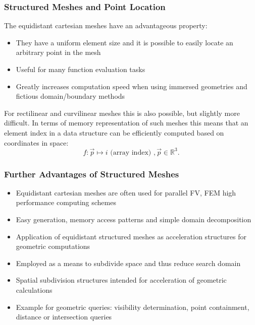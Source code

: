 \begin{frame}
\frametitle{Structured Meshes and Point Location}
The equidistant cartesian meshes have an advantageous property: 
\begin{itemize}
\item They have a uniform element size and it is possible to easily locate an arbitrary point in the mesh
\item Useful for many function evaluation tasks
\item Greatly increases computation speed when using immersed geometries and fictious domain/boundary methods
\end{itemize}
For rectilinear and curvilinear meshes this is also possible, but slightly more difficult. In terms of memory representation of such meshes this means that an element index in a data structure can be efficiently computed based on coordinates in space:
\begin{equation*}
  f: \vec{p} \mapsto i\text{ (array index) }, \vec{p} \in \mathbb{R}^3.
  \label{eq:struct-map}
\end{equation*}
\end{frame}

\begin{frame}
\frametitle{Further Advantages of Structured Meshes}
\begin{itemize}
\item Equidistant cartesian meshes are often used for parallel FV, FEM high performance computing schemes
\item Easy generation, memory access patterns and simple domain decomposition
\item Application of equidistant structured meshes as acceleration structures for geometric computations
\item Employed as a means to subdivide space and thus reduce search domain
\item Spatial subdivision structures intended for acceleration of geometric calculations 
\item Example for geometric queries: visibility determination, point containment, distance or intersection queries
\end{itemize}
\end{frame}


